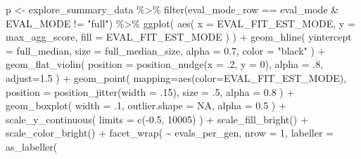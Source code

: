 \documentclass[
]{book}
\newenvironment{Shaded}{\begin{snugshade}}{\end{snugshade}}
\newcommand{\AttributeTok}[1]{\textcolor[rgb]{0.77,0.63,0.00}{#1}}
\newcommand{\ConstantTok}[1]{\textcolor[rgb]{0.00,0.00,0.00}{#1}}
\newcommand{\DecValTok}[1]{\textcolor[rgb]{0.00,0.00,0.81}{#1}}
\newcommand{\FloatTok}[1]{\textcolor[rgb]{0.00,0.00,0.81}{#1}}
\newcommand{\FunctionTok}[1]{\textcolor[rgb]{0.00,0.00,0.00}{#1}}
\newcommand{\NormalTok}[1]{#1}
\newcommand{\OtherTok}[1]{\textcolor[rgb]{0.56,0.35,0.01}{#1}}
\newcommand{\SpecialCharTok}[1]{\textcolor[rgb]{0.00,0.00,0.00}{#1}}
\newcommand{\StringTok}[1]{\textcolor[rgb]{0.31,0.60,0.02}{#1}}
\begin{document}
\begin{Shaded}
\begin{Highlighting}[]
\NormalTok{  p }\OtherTok{\textless{}{-}}\NormalTok{ explore\_summary\_data }\SpecialCharTok{\%\textgreater{}\%}
    \FunctionTok{filter}\NormalTok{(eval\_mode\_row }\SpecialCharTok{==}\NormalTok{ eval\_mode }\SpecialCharTok{\&}\NormalTok{ EVAL\_MODE }\SpecialCharTok{!=} \StringTok{"full"}\NormalTok{) }\SpecialCharTok{\%\textgreater{}\%}
    \FunctionTok{ggplot}\NormalTok{(}
      \FunctionTok{aes}\NormalTok{(}
        \AttributeTok{x =}\NormalTok{ EVAL\_FIT\_EST\_MODE,}
        \AttributeTok{y =}\NormalTok{ max\_agg\_score,}
        \AttributeTok{fill =}\NormalTok{ EVAL\_FIT\_EST\_MODE}
\NormalTok{      )}
\NormalTok{    ) }\SpecialCharTok{+}
    \FunctionTok{geom\_hline}\NormalTok{(}
      \AttributeTok{yintercept =}\NormalTok{ full\_median,}
      \AttributeTok{size =}\NormalTok{ full\_median\_size,}
      \AttributeTok{alpha =} \FloatTok{0.7}\NormalTok{,}
      \AttributeTok{color =} \StringTok{"black"}
\NormalTok{    ) }\SpecialCharTok{+}
    \FunctionTok{geom\_flat\_violin}\NormalTok{(}
      \AttributeTok{position =} \FunctionTok{position\_nudge}\NormalTok{(}\AttributeTok{x =}\NormalTok{ .}\DecValTok{2}\NormalTok{, }\AttributeTok{y =} \DecValTok{0}\NormalTok{),}
      \AttributeTok{alpha =}\NormalTok{ .}\DecValTok{8}\NormalTok{,}
      \AttributeTok{adjust=}\FloatTok{1.5}
\NormalTok{    ) }\SpecialCharTok{+}
    \FunctionTok{geom\_point}\NormalTok{(}
      \AttributeTok{mapping=}\FunctionTok{aes}\NormalTok{(}\AttributeTok{color=}\NormalTok{EVAL\_FIT\_EST\_MODE),}
      \AttributeTok{position =} \FunctionTok{position\_jitter}\NormalTok{(}\AttributeTok{width =}\NormalTok{ .}\DecValTok{15}\NormalTok{),}
      \AttributeTok{size =}\NormalTok{ .}\DecValTok{5}\NormalTok{,}
      \AttributeTok{alpha =} \FloatTok{0.8}
\NormalTok{    ) }\SpecialCharTok{+}
    \FunctionTok{geom\_boxplot}\NormalTok{(}
      \AttributeTok{width =}\NormalTok{ .}\DecValTok{1}\NormalTok{,}
      \AttributeTok{outlier.shape =} \ConstantTok{NA}\NormalTok{,}
      \AttributeTok{alpha =} \FloatTok{0.5}
\NormalTok{    ) }\SpecialCharTok{+}
    \FunctionTok{scale\_y\_continuous}\NormalTok{(}
      \AttributeTok{limits =} \FunctionTok{c}\NormalTok{(}\SpecialCharTok{{-}}\FloatTok{0.5}\NormalTok{, }\DecValTok{10005}\NormalTok{)}
\NormalTok{    ) }\SpecialCharTok{+}
    \FunctionTok{scale\_fill\_bright}\NormalTok{() }\SpecialCharTok{+}
    \FunctionTok{scale\_color\_bright}\NormalTok{() }\SpecialCharTok{+}
    \FunctionTok{facet\_wrap}\NormalTok{(}
    \SpecialCharTok{\textasciitilde{}}\NormalTok{ evals\_per\_gen,}
    \AttributeTok{nrow =} \DecValTok{1}\NormalTok{,}
    \AttributeTok{labeller =} \FunctionTok{as\_labeller}\NormalTok{(}

\end{Highlighting}
\end{Shaded}
\end{document}
